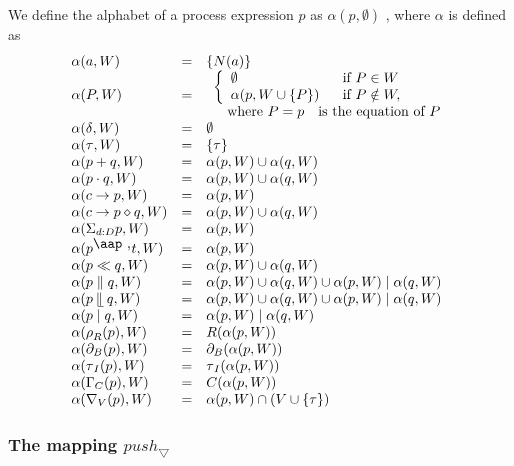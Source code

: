 \documentclass{article}
\begin{document}
We define the alphabet of a process expression $p$ as $\alpha (p,\emptyset )$%
, where $\alpha $ is defined as%
\[
\begin{array}{lll}
\alpha (a,W) & = & \{N(a)\} \\ 
\alpha (P,W) & = & 
\begin{array}{l}
\left\{ 
\begin{array}{ll}
\emptyset & \text{if }P\in W \\ 
\alpha (p,W\cup \{P\}) & \text{if }P\notin W,%
\end{array}%
\right. \\ 
\text{ where }P=p\text{ is the equation of }P%
\end{array}
\\ 
\alpha (\delta ,W) & = & \emptyset \\ 
\alpha (\tau ,W) & = & \{\tau \} \\ 
\alpha (p+q,W) & = & \alpha (p,W)\cup \alpha (q,W) \\ 
\alpha (p\cdot q,W) & = & \alpha (p,W)\cup \alpha (q,W) \\ 
\alpha (c\rightarrow p,W) & = & \alpha (p,W) \\ 
\alpha (c\rightarrow p\diamond q,W) & = & \alpha (p,W)\cup \alpha (q,W) \\ 
\alpha (\Sigma _{d:D}p,W) & = & \alpha (p,W) \\ 
\alpha (p^{\mathbin{\mbox{\aap
,}}}t,W) & = & \alpha (p,W) \\ 
\alpha (p\ll q,W) & = & \alpha (p,W)\cup \alpha (q,W) \\ 
\alpha (p\parallel q,W) & = & \alpha (p,W)\cup \alpha (q,W)\cup \alpha
(p,W)\mid \alpha (q,W) \\ 
\alpha (p\mathbin{\mathrel{\llfloor}}q,W) & = & \alpha (p,W)\cup \alpha
(q,W)\cup \alpha (p,W)\mid \alpha (q,W) \\ 
\alpha (p\mid q,W) & = & \alpha (p,W)\mid \alpha (q,W) \\ 
\alpha (\rho _{R}(p),W) & = & R(\alpha (p,W)) \\ 
\alpha (\partial _{B}(p),W) & = & \partial _{B}(\alpha (p,W)) \\ 
\alpha (\tau _{I}(p),W) & = & \tau _{I}(\alpha (p,W)) \\ 
\alpha (\Gamma _{C}(p),W) & = & C(\alpha (p,W)) \\ 
\alpha (\nabla _{V}(p),W) & = & \alpha (p,W)\cap (V\cup \{\tau \})%
\end{array}%
\]

\newpage

\subsubsection{The mapping $push_{\bigtriangledown }$}
\end{document}
